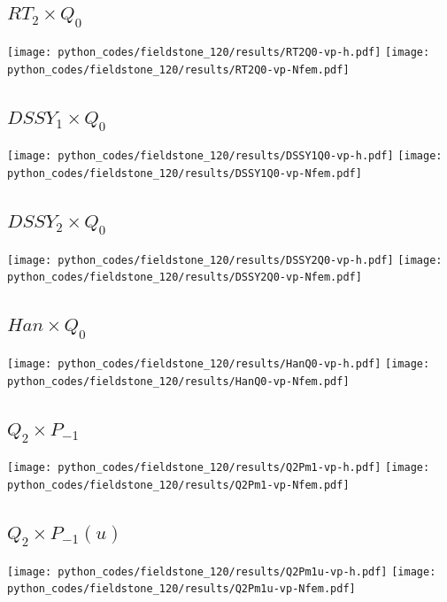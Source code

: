 \subsection*{$RT_2\times Q_0$}
\begin{center}
\texttt{[image: python\_codes/fieldstone\_120/results/RT2Q0-vp-h.pdf]}
\texttt{[image: python\_codes/fieldstone\_120/results/RT2Q0-vp-Nfem.pdf]}
\end{center}

\subsection*{$DSSY_1\times Q_0$}
\begin{center}
\texttt{[image: python\_codes/fieldstone\_120/results/DSSY1Q0-vp-h.pdf]}
\texttt{[image: python\_codes/fieldstone\_120/results/DSSY1Q0-vp-Nfem.pdf]}
\end{center}

\subsection*{$DSSY_2\times Q_0$}
\begin{center}
\texttt{[image: python\_codes/fieldstone\_120/results/DSSY2Q0-vp-h.pdf]}
\texttt{[image: python\_codes/fieldstone\_120/results/DSSY2Q0-vp-Nfem.pdf]}
\end{center}

\subsection*{$Han\times Q_0$}
\begin{center}
\texttt{[image: python\_codes/fieldstone\_120/results/HanQ0-vp-h.pdf]}
\texttt{[image: python\_codes/fieldstone\_120/results/HanQ0-vp-Nfem.pdf]}
\end{center}

\subsection*{$Q_2\times P_{-1}$}
\begin{center}
\texttt{[image: python\_codes/fieldstone\_120/results/Q2Pm1-vp-h.pdf]}
\texttt{[image: python\_codes/fieldstone\_120/results/Q2Pm1-vp-Nfem.pdf]}
\end{center}

\subsection*{$Q_2\times P_{-1}(u)$}
\begin{center}
\texttt{[image: python\_codes/fieldstone\_120/results/Q2Pm1u-vp-h.pdf]}
\texttt{[image: python\_codes/fieldstone\_120/results/Q2Pm1u-vp-Nfem.pdf]}
\end{center}

